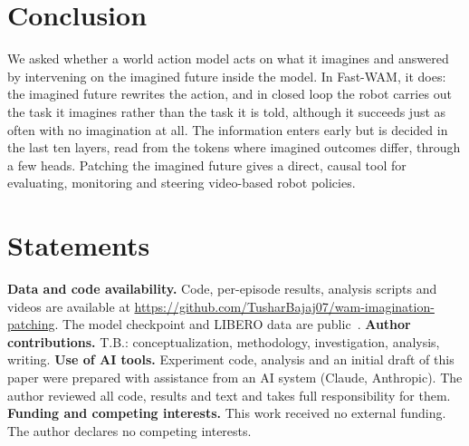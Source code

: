 \documentclass[conference]{IEEEtran}
\begin{document}
\section{Conclusion}

We asked whether a world action model acts on what it imagines and answered by intervening on the imagined future
inside the model. In Fast-WAM, it does: the imagined future rewrites the action, and in closed loop the robot carries out
the task it imagines rather than the task it is told, although it succeeds just as often with no imagination at all.
The information enters early but is decided in the last ten
layers, read from the tokens where imagined outcomes differ, through a few heads. Patching the imagined future gives a
direct, causal tool for evaluating, monitoring and steering video-based robot policies.

\section*{Statements}
\textbf{Data and code availability.} Code, per-episode results, analysis scripts and videos are available at
\url{https://github.com/TusharBajaj07/wam-imagination-patching}. The model checkpoint and LIBERO data are public~\cite{yuan2026fastwam,liu2023libero}.
\textbf{Author contributions.}
T.B.: conceptualization, methodology, investigation, analysis, writing.
\textbf{Use of AI tools.} Experiment code, analysis and an initial draft of this paper were prepared with assistance
from an AI system (Claude, Anthropic). The author reviewed all code, results and text and takes full responsibility
for them.
\textbf{Funding and competing interests.} This work received no external funding. The author declares no competing interests.



\end{document}
